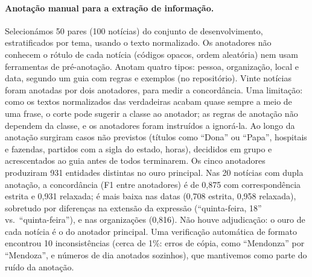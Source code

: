 \paragraph{Anotação manual para a extração de informação.}
Selecionámos 50 pares (100 notícias) do conjunto de desenvolvimento, estratificados por tema,
usando o texto normalizado. Os anotadores não conhecem o rótulo de cada notícia (códigos opacos,
ordem aleatória) nem usam ferramentas de pré-anotação. Anotam quatro tipos: pessoa, organização,
local e data, segundo um guia com regras e exemplos (no repositório). Vinte notícias foram
anotadas por dois anotadores, para medir a concordância. Uma limitação: como os textos normalizados
das verdadeiras acabam quase sempre a meio de uma frase, o corte pode sugerir a classe ao anotador;
as regras de anotação não dependem da classe, e os anotadores foram instruídos a ignorá-la.
Ao longo da anotação surgiram casos não previstos (títulos como ``Dona'' ou ``Papa'', hospitais e
fazendas, partidos com a sigla do estado, horas), decididos em grupo e acrescentados ao guia antes de
todos terminarem. Os cinco anotadores produziram 931 entidades distintas no ouro principal. Nas 20
notícias com dupla anotação, a concordância (F1 entre anotadores) é de 0,875 com correspondência
estrita e 0,931 relaxada; é mais baixa nas datas (0,708 estrita, 0,958 relaxada), sobretudo por
diferenças na extensão da expressão (``quinta-feira, 18'' vs.\ ``quinta-feira''), e nas organizações
(0,816). Não houve adjudicação: o ouro de cada notícia é o do anotador principal. Uma verificação
automática de formato encontrou 10 inconsistências (cerca de 1\%: erros de cópia, como ``Mendonza''
por ``Mendoza'', e números de dia anotados sozinhos), que mantivemos como parte do ruído da anotação.
